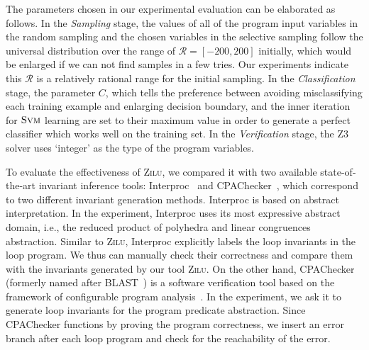 The parameters chosen in our experimental evaluation can be elaborated as follows. 
In the \emph{Sampling} stage, 
the values of all of the program input variables in the random sampling 
and the chosen variables in the selective sampling 
follow the universal distribution over the range of $\mathcal{R} = [-200, 200]$ initially,
which would be enlarged if we can not find samples in a few tries.
Our experiments indicate this $\mathcal{R}$ is a relatively rational range for the initial sampling.
In the \emph{Classification} stage, 
the parameter $C$, 
which tells the preference between avoiding misclassifying each training example and enlarging decision boundary,
and the inner iteration 
for $\textsc{Svm}$ learning are set to their maximum value 
in order to generate a perfect classifier which works well on the training set. 
In the \emph{Verification} stage, 
the Z3 solver uses `integer' as the type of the program variables. 

To evaluate the effectiveness of \textsc{Zilu}, 
we compared it with two available state-of-the-art invariant inference tools: 
Interproc~\cite{jeannet2010interproc} and CPAChecker~\cite{beyer2011cpachecker}, 
which correspond to two different invariant generation methods. 
Interproc is based on abstract interpretation. 
In the experiment, Interproc uses its most expressive abstract domain, i.e., 
the reduced product of polyhedra and linear congruences abstraction. 
Similar to \textsc{Zilu}, Interproc explicitly labels the loop invariants in the loop program. 
We thus can manually check their correctness
and compare them with the invariants generated by our tool \textsc{Zilu}. 
On the other hand, CPAChecker (formerly named after BLAST~\cite{henzinger2003software}) is a software verification tool 
based on the framework of configurable program analysis~\cite{beyer2007configurable}. 
In the experiment, we ask it to generate loop invariants for the program predicate abstraction. 
Since CPAChecker functions by proving the program correctness, 
we insert an error branch after each loop program and check for the reachability of the error. 

